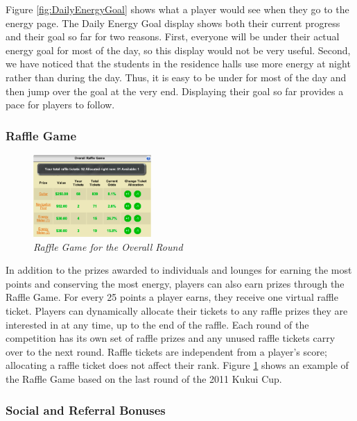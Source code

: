 \documentclass{acm_proc_article-sp}
\begin{document}
Figure \ref{fig:DailyEnergyGoal} shows what a player would see when they go to the energy page. The Daily Energy Goal display shows both their current progress and their goal so far for two reasons. First, everyone will be under their actual energy goal for most of the day, so this display would not be very useful. Second, we have noticed that the students in the residence halls use more energy at night rather than during the day. Thus, it is easy to be under for most of the day and then jump over the goal at the very end. Displaying their goal so far provides a pace for players to follow. 

\subsubsection{Raffle Game}

\begin{figure}[t!]
  \center
  \includegraphics[width=0.4\textwidth]{raffle-small.eps}
  \caption{\em \small Raffle Game for the Overall Round}
  \label{fig:RaffleGame}
\end{figure}

In addition to the prizes awarded to individuals and lounges for earning the most points and conserving the most energy, players can also earn prizes through the Raffle Game. For every 25 points a player earns, they receive one virtual raffle ticket. Players can dynamically allocate their tickets to any raffle prizes they are interested in at any time, up to the end of the raffle. Each round of the competition has its own set of raffle prizes and any unused raffle tickets carry over to the next round. Raffle tickets are independent from a player's score; allocating a raffle ticket does not affect their rank. Figure \ref{fig:RaffleGame} shows an example of the Raffle Game based on the last round of the 2011 Kukui Cup.

\subsubsection{Social and Referral Bonuses}
\end{document}
